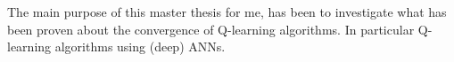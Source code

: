 
The main purpose of this master thesis for me,
has been to investigate what has been proven
about the convergence of Q-learning algorithms.
In particular Q-learning algorithms using (deep) ANNs.


